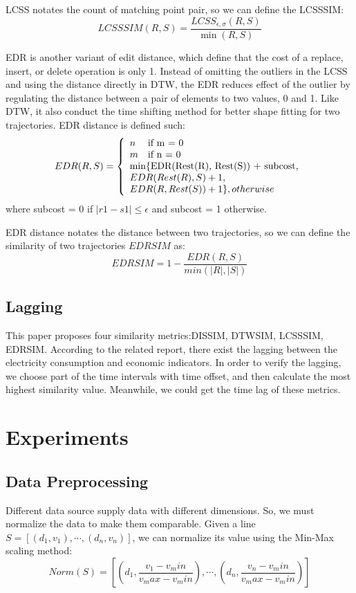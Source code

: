 \documentclass{sig-alternate-05-2015}
\begin{document}
LCSS notates the count of matching point pair, so we can define the LCSSSIM:
\begin{equation}\label{sim:less}
	LCSSSIM(R,S)=\frac{LCSS_{\epsilon ,\sigma }(R,S)}{\min(R,S)}
\end{equation}

EDR is another variant of edit distance, which define that the cost of a replace, insert, or delete operation is only 1. Instead of omitting the outliers in the LCSS and using the distance directly in DTW, the EDR reduces effect of the outlier by regulating the distance between a pair of elements to two values, 0 and 1. Like DTW, it also conduct the time shifting method for better shape fitting for two trajectories. EDR distance is defined such:
\begin{equation}
	EDR(R, S) = \left\{
	\begin{array}{ll}
		n & \text{if m = 0} \\
		m & \text{if n = 0} \\
		\multicolumn{2}{l}{\text{min\{EDR(Rest(R), Rest(S)) + subcost,}} \\
		\multicolumn{2}{l}{EDR(Rest(R), S) + 1, } \\
		\multicolumn{2}{l}{EDR(R, Rest(S)) + 1\}, otherwise}  
	\end{array}
	\right.
\end{equation}
where subcost = 0 if $|r1 - s1| \leq \epsilon$ and subcost = 1 otherwise.

EDR distance notates the distance between two trajectories, so we can define the similarity of two trajectories $EDRSIM$ as:
\begin{equation}
	EDRSIM=1 - \frac{EDR(R,S)}{min(|R|, |S|)}
\end{equation} 
\subsection{Lagging}
This paper proposes four similarity metrics:DISSIM, DTWSIM, LCSSSIM, EDRSIM. According to the related report, there exist the lagging between the electricity consumption and economic indicators. In order to verify the lagging, we choose part of the time intervals with time offset, and then calculate the most highest similarity value. Meanwhile, we could get the time lag of these metrics. 
\section{Experiments}
\subsection{Data Preprocessing}
Different data source supply data with different dimensions. So, we must normalize the data to make them comparable. 
Given a line $S = [(d_1, v_1), \cdots, (d_n, v_n)]$, we can normalize its value using the Min-Max scaling method:
\begin{equation}
	Norm(S) = [(d_1, \frac{v_1 - v_min}{v_max - v_min}), \cdots, (d_n, \frac{v_n - v_min}{v_max - v_min})]
\end{equation}
\end{document}
